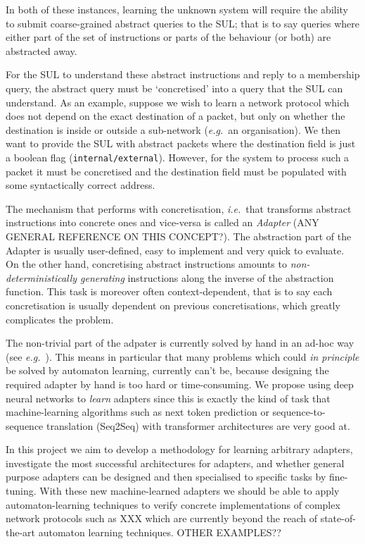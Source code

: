 \documentclass[11pt,a4paper]{article}
\newcommand{\ie}{\textit{i.e.}\ }
\newcommand{\eg}{\textit{e.g.}\ }
\begin{document}
			In both of these instances, learning the unknown system will require the ability to submit coarse-grained abstract queries to the SUL; that is to say queries where either part of the set of instructions or parts of the behaviour (or both) are abstracted away. 
			
			For the SUL to understand these abstract instructions and reply to a membership query, the abstract query must be `concretised' into a query that the SUL can understand.  As an example, suppose we wish to learn a network protocol which does not depend on the exact destination of a packet, but only on whether the destination is inside or outside a sub-network (\eg an organisation). We then want to provide the SUL with abstract packets where the destination field is just a boolean flag (\texttt{internal/external}). However, for the system to process such a packet it must be concretised and the destination field must be populated with some syntactically correct address.
			
			The mechanism that performs with concretisation, \ie that transforms abstract instructions into concrete ones and vice-versa is called an \emph{Adapter} \cite{ferreira2021prognosis} (ANY GENERAL REFERENCE ON THIS CONCEPT?). The abstraction part of the Adapter is usually user-defined, easy to implement and very quick to evaluate. On the other hand, concretising abstract instructions amounts to \emph{non-deterministically generating} instructions along the inverse of the abstraction function. This task is moreover often context-dependent, that is to say each concretisation is usually dependent on previous concretisations, which greatly complicates the problem. 
			
			The non-trivial part of the adpater is currently solved by hand in an ad-hoc way (see \eg \cite{ferreira2021prognosis}). This means in particular that many problems which could \emph{in principle} be solved by automaton learning, currently can't be, because designing the required adapter by hand is too hard or time-consuming.
			We propose using deep neural networks to \emph{learn} adapters since this is exactly the kind of task that machine-learning algorithms such as next token prediction or sequence-to-sequence translation (Seq2Seq) with transformer architectures are very good at. 
			
			In this project we aim to develop a methodology for learning arbitrary adapters, investigate the most successful architectures for adapters, and whether general purpose adapters can be designed and then specialised to specific tasks by fine-tuning. With these new machine-learned adapters we should be able to apply automaton-learning techniques to verify concrete implementations of complex network protocols such as XXX which are currently beyond the reach of state-of-the-art automaton learning techniques. OTHER EXAMPLES??
		
\end{document}
